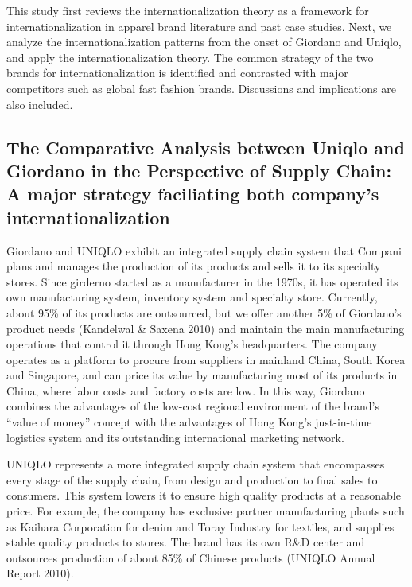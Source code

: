 \documentclass[]{article}
\begin{document}
This study first reviews the internationalization theory as a framework
for internationalization in apparel brand literature and past case
studies. Next, we analyze the internationalization patterns from the
onset of Giordano and Uniqlo, and apply the internationalization theory.
The common strategy of the two brands for internationalization is
identified and contrasted with major competitors such as global fast
fashion brands. Discussions and implications are also included.

\hypertarget{the-comparative-analysis-between-uniqlo-and-giordano-in-the-perspective-of-supply-chain-a-major-strategy-faciliating-both-companys-internationalization}{%
\subsection{The Comparative Analysis between Uniqlo and Giordano in the
Perspective of Supply Chain: A major strategy faciliating both company's
internationalization}\label{the-comparative-analysis-between-uniqlo-and-giordano-in-the-perspective-of-supply-chain-a-major-strategy-faciliating-both-companys-internationalization}}

Giordano and UNIQLO exhibit an integrated supply chain system that
Compani plans and manages the production of its products and sells it to
its specialty stores. Since girderno started as a manufacturer in the
1970s, it has operated its own manufacturing system, inventory system
and specialty store. Currently, about 95\% of its products are
outsourced, but we offer another 5\% of Giordano's product needs
(Kandelwal \& Saxena 2010) and maintain the main manufacturing
operations that control it through Hong Kong's headquarters. The company
operates as a platform to procure from suppliers in mainland China,
South Korea and Singapore, and can price its value by manufacturing most
of its products in China, where labor costs and factory costs are low.
In this way, Giordano combines the advantages of the low-cost regional
environment of the brand's ``value of money'' concept with the
advantages of Hong Kong's just-in-time logistics system and its
outstanding international marketing network.

UNIQLO represents a more integrated supply chain system that encompasses
every stage of the supply chain, from design and production to final
sales to consumers. This system lowers it to ensure high quality
products at a reasonable price. For example, the company has exclusive
partner manufacturing plants such as Kaihara Corporation for denim and
Toray Industry for textiles, and supplies stable quality products to
stores. The brand has its own R\&D center and outsources production of
about 85\% of Chinese products (UNIQLO Annual Report 2010).
\end{document}
